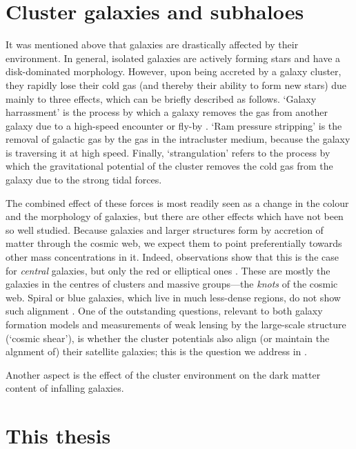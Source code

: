 \section{Cluster galaxies and subhaloes}

It was mentioned above that galaxies are drastically affected by their environment. In general, isolated galaxies are actively forming stars and have a disk-dominated morphology. However, upon being accreted by a galaxy cluster, they rapidly lose their cold gas (and thereby their ability to form new stars) due mainly to three effects, which can be briefly described as follows. `Galaxy harrassment' is the process by which a galaxy removes the gas from another galaxy due to a high-speed encounter or fly-by \citep{?}. `Ram pressure stripping' is the removal of galactic gas by the gas in the intracluster medium, because the galaxy is traversing it at high speed. Finally, `strangulation' refers to the process by which the gravitational potential of the cluster removes the cold gas from the galaxy due to the strong tidal forces.

The combined effect of these forces is most readily seen as a change in the colour and the morphology of galaxies, but there are other effects which have not been so well studied. Because galaxies and larger structures form by accretion of matter through the cosmic web, we expect them to point preferentially towards other mass concentrations in it. Indeed, observations show that this is the case for \emph{central} galaxies, but only the red or elliptical ones \citep{?}. These are mostly the galaxies in the centres of clusters and massive groups---the \emph{knots} of the cosmic web. Spiral or blue galaxies, which live in much less-dense regions, do not show such alignment \citep{?}. One of the outstanding questions, relevant to both galaxy formation models and measurements of weak lensing by the large-scale structure (`cosmic shear'), is whether the cluster potentials also align (or maintain the algnment of) their satellite galaxies; this is the question we address in .

Another aspect is the effect of the cluster environment on the dark matter content of infalling galaxies. %




\section{This thesis}

